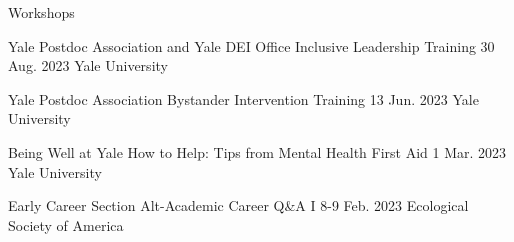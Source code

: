 Workshops

\begin{cventries}

  \cventry
    {Yale Postdoc Association and Yale DEI Office} %
    {Inclusive Leadership Training} %
    {30 Aug. 2023} %
    {Yale University} %
    {
    }

  \cventry
    {Yale Postdoc Association} %
    {Bystander Intervention Training} %
    {13 Jun. 2023} %
    {Yale University} %
    {
    }

  \cventry
    {Being Well at Yale} %
    {How to Help: Tips from Mental Health First Aid} %
    {1 Mar. 2023} %
    {Yale University} %
    {
    }

  \cventry
    {Early Career Section} %
    {Alt-Academic Career Q\&A I} %
    {8-9 Feb. 2023} %
    {Ecological Society of America} %
    {
    }    


\end{cventries}
